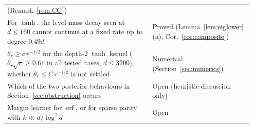 \documentclass[11pt]{article}
\theoremstyle{definition}\newtheorem{assumption}[theorem]{Assumption}
\theoremstyle{remark}\newtheorem{remark}[theorem]{Remark}
\begin{document}
\begin{longtable}{@{}>{\raggedright\arraybackslash}p{}
 >{\raggedright\arraybackslash}p{}@{}}
(Remark~\ref{rem:CG})\\\addlinespace[3pt]
For $\tanh$, the level-mass decay seen at $d\le160$ cannot continue at a
fixed rate up to degree $0.49d$ & Proved (Lemma~\ref{lem:eiglower}(a),
Cor.~\ref{cor:composite})\\\addlinespace[3pt]
$\theta_r\ge c\,r^{-1/2}$ for the depth-$2$ $\tanh$ kernel
($\theta_r\sqrt r\ge0.61$ in all tested cases, $d\le3200$); whether
$\theta_r\le C\,r^{-1/2}$ is not settled & Numerical
(Section~\ref{sec:numerics})\\\addlinespace[3pt]
Which of the two posterior behaviours in Section~\ref{sec:obstruction} occurs & Open (heuristic discussion only)\\\addlinespace[3pt]
Margin learner for $\operatorname{erf}$, or for sparse parity with
$k\ll d/\log^2d$ & Open\\
\end{longtable}
\end{document}
